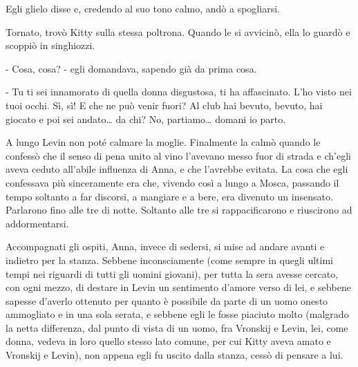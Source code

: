 Egli glielo disse e, credendo al suo tono calmo, andò a spogliarsi. 

Tornato, trovò Kitty sulla stessa poltrona. Quando le si avvicinò, ella lo guardò e scoppiò in singhiozzi. 

- Cosa, cosa? - egli domandava, sapendo già da prima cosa. 

- Tu ti sei innamorato di quella donna disgustosa, ti ha affascinato. L'ho visto nei tuoi occhi. Sì, sì! E che ne può venir fuori? Al club hai bevuto, bevuto, hai giocato e poi sei andato\ldots{} da chi? No, partiamo\ldots{} domani io parto. 

A lungo Levin non poté calmare la moglie. Finalmente la calmò quando le confessò che il senso di pena unito al vino l'avevano messo fuor di strada e ch'egli aveva ceduto all'abile influenza di Anna, e che l'avrebbe evitata. La cosa che egli confessava più sinceramente era che, vivendo così a lungo a Mosca, passando il tempo soltanto a far discorsi, a mangiare e a bere, era divenuto un insensato. Parlarono fino alle tre di notte. Soltanto alle tre si rappacificarono e riuscirono ad addormentarsi. 

\label{xii-6} 

Accompagnati gli ospiti, Anna, invece di sedersi, si mise ad andare avanti e indietro per la stanza. Sebbene inconsciamente (come sempre in quegli ultimi tempi nei riguardi di tutti gli uomini giovani), per tutta la sera avesse cercato, con ogni mezzo, di destare in Levin un sentimento d'amore verso di lei, e sebbene sapesse d'averlo ottenuto per quanto è possibile da parte di un uomo onesto ammogliato e in una sola serata, e sebbene egli le fosse piaciuto molto (malgrado la netta differenza, dal punto di vista di un uomo, fra Vronskij e Levin, lei, come donna, vedeva in loro quello stesso lato comune, per cui Kitty aveva amato e Vronskij e Levin), non appena egli fu uscito dalla stanza, cessò di pensare a lui. 

